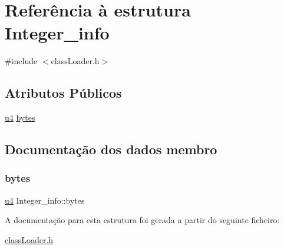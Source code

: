 \hypertarget{struct_integer__info}{}\section{Referência à estrutura Integer\+\_\+info}
\label{struct_integer__info}


{\ttfamily \#include $<$class\+Loader.\+h$>$}

\subsection*{Atributos Públicos}
\begin{DoxyCompactItemize}
\item 
\hyperlink{util_8h_ae391a1d79bb0c8cbc283f0283e3c098b}{u4} \hyperlink{struct_integer__info_aa16245fe87a39c0881ab8d8c25a7c797}{bytes}
\end{DoxyCompactItemize}


\subsection{Documentação dos dados membro}
\mbox{\label{struct_integer__info_aa16245fe87a39c0881ab8d8c25a7c797}} 
\subsubsection{\texorpdfstring{bytes}{bytes}}
{\footnotesize\ttfamily \hyperlink{util_8h_ae391a1d79bb0c8cbc283f0283e3c098b}{u4} Integer\+\_\+info\+::bytes}



A documentação para esta estrutura foi gerada a partir do seguinte ficheiro\+:\begin{DoxyCompactItemize}
\item 
\hyperlink{class_loader_8h}{class\+Loader.\+h}\end{DoxyCompactItemize}
